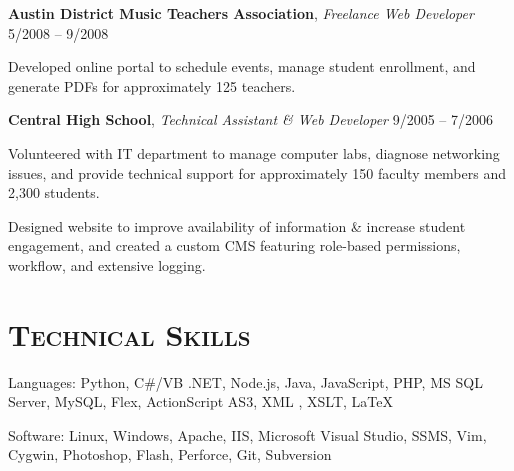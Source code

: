 \documentclass[12pt,a4paper]{article}
\newcommand{\sectionhead}{\normalfont\normalsize\scshape}
\newcommand{\workhead}[3]{\textbf{#1}, \emph{#2} \hfill #3}
\newcommand{\li}{\item[--]}
\begin{document}
\begin{description}[leftmargin=0em]
    \item
        \workhead{Austin District Music Teachers Association}{Freelance Web Developer}{5/2008 -- 9/2008}
        \begin{itemize*}
            \li Developed online portal to schedule events, manage student enrollment, and generate PDFs for approximately 125 teachers.
        \end{itemize*}


    \item
        \workhead{Central High School}{Technical Assistant \& Web Developer}{9/2005 -- 7/2006}
        \begin{itemize*}
            \li Volunteered with IT department to manage computer labs, diagnose networking issues, and provide technical support for approximately 150 faculty members and 2,300 
students.
            \li Designed website to improve availability of information \& increase student engagement, and created a custom CMS featuring role-based permissions, workflow, and extensive logging.
        \end{itemize*}
\end{description}

\section*{\sectionhead Technical Skills}
\begin{description}
    \itemsep0pt
    \parskip5pt
    \item Languages: Python, C\#/VB .NET, Node.js, Java, JavaScript, PHP, MS SQL Server, MySQL, Flex, ActionScript AS3, XML \Smiley, XSLT, \LaTeX
    \item Software: Linux, Windows, Apache, IIS, Microsoft Visual Studio, SSMS, Vim, Cygwin, Photoshop, Flash, Perforce, Git, Subversion
\end{description}
\end{document}
